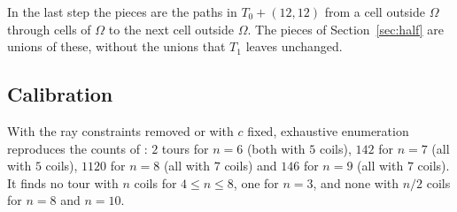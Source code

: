\documentclass[11pt]{amsart}
\theoremstyle{remark}
\begin{document}
In the last step the pieces are the paths in $T_0+(12,12)$ from a cell outside $\Omega$ through cells of $\Omega$ to
the next cell outside $\Omega$. The pieces of Section~\ref{sec:half} are unions of these, without the unions that
$T_1$ leaves unchanged.

\subsection*{Calibration}
With the ray constraints removed or with $c$ fixed, exhaustive enumeration reproduces the counts of
\cite[answer 229]{knuth}: $2$ tours for $n=6$ (both with $5$ coils), $142$ for $n=7$ (all with $5$ coils), $1120$ for $n=8$
(all with $7$ coils) and $146$ for $n=9$ (all with $7$ coils). It finds no tour with $n$ coils for $4\le n\le8$, one for
$n=3$, and none with $n/2$ coils for $n=8$ and $n=10$.
\end{document}
